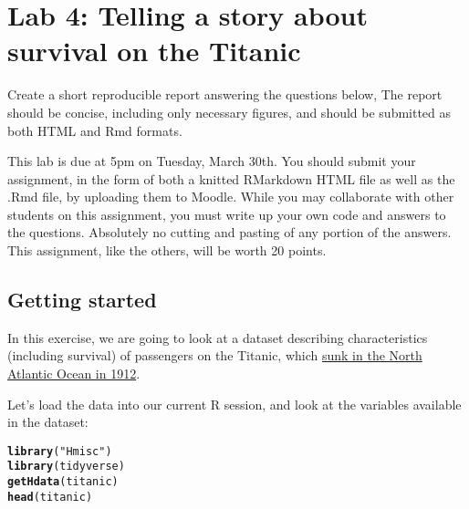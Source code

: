 \documentclass{article}\usepackage[]{graphicx}\usepackage[]{color}
\makeatletter
\newcommand{\hlstr}[1]{\textcolor[rgb]{0.192,0.494,0.8}{#1}}%
\newcommand{\hlstd}[1]{\textcolor[rgb]{0.345,0.345,0.345}{#1}}%
\newcommand{\hlkwd}[1]{\textcolor[rgb]{0.737,0.353,0.396}{\textbf{#1}}}%
\newenvironment{kframe}{%
 \def\at@end@of@kframe{}%
 \ifinner\ifhmode%
  \def\at@end@of@kframe{\end{minipage}}%
  \begin{minipage}{\columnwidth}%
 \fi\fi%
 \def\FrameCommand##1{\hskip\@totalleftmargin \hskip-\fboxsep
 \colorbox{shadecolor}{##1}\hskip-\fboxsep
     \hskip-\linewidth \hskip-\@totalleftmargin \hskip\columnwidth}%
 \MakeFramed {\advance\hsize-\width
   \@totalleftmargin\z@ \linewidth\hsize
   \@setminipage}}%
 {\par\unskip\endMakeFramed%
 \at@end@of@kframe}
\newenvironment{knitrout}{}{} %
\makeatother
\begin{document}

\section*{Lab 4: Telling a story about survival on the Titanic}

Create a short reproducible report answering the questions below, The report should be concise, including only necessary figures, and should be submitted as both HTML and Rmd formats. 

This lab is due at 5pm on Tuesday, March 30th. You should submit your assignment, in the form of both a knitted RMarkdown HTML file as well as the .Rmd file, by uploading them to Moodle. While you may collaborate with other students on this assignment, you must write up your own code and answers to the questions. Absolutely no cutting and pasting of any portion of the answers. This assignment, like the others, will be worth 20 points.

\subsection*{Getting started}
In this exercise, we are going to look at a dataset describing characteristics (including survival) of passengers on the Titanic, which \href{https://en.wikipedia.org/wiki/RMS_Titanic}{sunk in the North Atlantic Ocean in 1912}. 

Let's load the data into our current R session, and look at the variables available in the dataset:

\begin{knitrout}
\color{fgcolor}\begin{kframe}
\begin{alltt}
\hlkwd{library}\hlstd{(}\hlstr{"Hmisc"}\hlstd{)}
\hlkwd{library}\hlstd{(tidyverse)}
\hlkwd{getHdata}\hlstd{(titanic)}
\hlkwd{head}\hlstd{(titanic)}
\end{alltt}
\end{kframe}
\end{knitrout}
\end{document}
